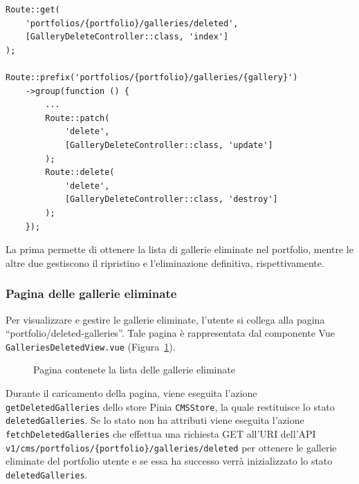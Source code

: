 \begin{lstlisting}[caption={Route per la gestione delle gallerie eliminate}, label={lst:route_g_del}]
Route::get(
	'portfolios/{portfolio}/galleries/deleted',
	[GalleryDeleteController::class, 'index']
);

Route::prefix('portfolios/{portfolio}/galleries/{gallery}')
	->group(function () {
		...
		Route::patch(
			'delete',
			[GalleryDeleteController::class, 'update']
		);
		Route::delete(
			'delete',
			[GalleryDeleteController::class, 'destroy']
		);
	});
\end{lstlisting}


La prima permette di ottenere la lista di gallerie eliminate nel portfolio, mentre le altre due gestiscono il ripristino e l'eliminazione definitiva, rispettivamente.
\subsubsection{Pagina delle gallerie eliminate}
Per visualizzare e gestire le gallerie eliminate, l'utente si collega alla pagina ``portfolio/deleted-galleries''. Tale pagina \`e rappresentata dal componente Vue \verb|GalleriesDeletedView.vue| (Figura~\ref{fig:cms-g-del}).

\begin{figure}[htbp]
	\centering
	\fboxsep=0.5pt
	\fboxrule=0.5pt
	\caption{Pagina contenete la lista delle gallerie eliminate}
	\label{fig:cms-g-del}
\end{figure}



Durante il caricamento della pagina, viene eseguita l'azione \verb|getDeletedGalleries| dello store Pinia \verb|CMSStore|, la quale restituisce lo stato \verb|deletedGalleries|. Se lo stato non ha attributi viene eseguita l'azione \verb|fetchDeletedGalleries| che effettua una richiesta GET all'URI dell'API \verb|v1/cms/portfolios/{portfolio}/galleries/deleted| per ottenere le gallerie eliminate del portfolio utente e se essa ha successo verr\`a inizializzato lo stato \verb|deletedGalleries|. 

